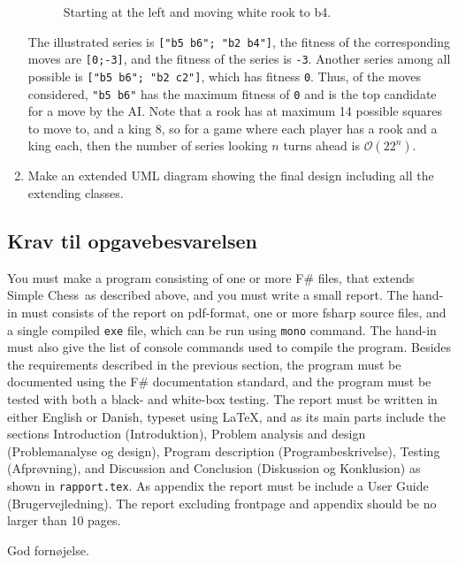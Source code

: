 \documentclass[a4paper,12pt]{article}
\newcommand{\chess}{Simple Chess}
\begin{document}
\begin{enumerate}[label=11g.\arabic*,start=0]
\begin{figure}
  \centering
  \newgame
  \caption{Starting at the left and moving white rook to b4.}
  \label{fig:chessKingsGame}
\end{figure}
The illustrated series is \lstinline{["b5 b6"; "b2 b4"]}, the fitness of the corresponding moves are \lstinline{[0;-3]}, and the fitness of the series is \lstinline{-3}. Another series among all possible is \lstinline{["b5 b6"; "b2 c2"]}, which has fitness \lstinline{0}. Thus, of the moves considered,  \lstinline{"b5 b6"} has the maximum fitness of \lstinline{0} and is the top candidate for a move by the AI. Note that a rook has at maximum 14 possible squares to move to, and a king 8, so for a game where each player has a rook and a king each, then the number of series looking $n$ turns ahead is $\mathcal{O}(22^n)$.
\item Make an extended UML diagram showing the final design including all the extending classes.
\end{enumerate}

\subsection*{Krav til opgavebesvarelsen}
You must make a program consisting of one or more F\# files, that extends \chess\ as described above, and you must write a small report. The hand-in must consists of the report on pdf-format, one or more fsharp source files, and a single compiled \lstinline[language=console]{exe} file, which can be run using \lstinline[language=console]{mono} command. The hand-in must also give the list of console commands used to compile the program. Besides the requirements described in the previous section, the program must be documented using the F\# documentation standard, and the program must be tested with both a black- and white-box testing. The report must be written in either English or Danish, typeset using \LaTeX, and as its main parts include the sections Introduction (Introduktion), Problem analysis and design (Problemanalyse og design), Program description (Programbeskrivelse), Testing (Afprøvning), and Discussion and Conclusion (Diskussion og Konklusion) as shown in \texttt{rapport.tex}. As appendix the report must be include a User Guide (Brugervejledning). The report excluding frontpage and appendix should be no larger than 10 pages.
 
\flushright God fornøjelse.
\end{document}
